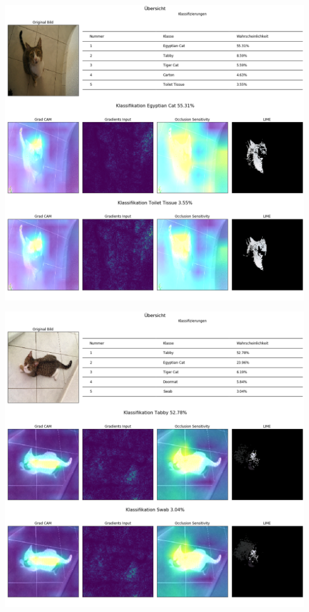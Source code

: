 \documentclass[
  12pt, %
  a4paper, %
  oneside, %
  openany, 
  numbers=noenddot, %
  BCOR=5mm, %
  parskip=half*, %
  thesis, %
]{bfhbook}
\begin{document}
\begin{center}
\begin{minipage}[t]{\linewidth}
\includegraphics[width=\textwidth]{Bilder/Mira-Classification.png}
\end{minipage}
\end{center}

\begin{center}
\begin{minipage}[t]{\linewidth}
\includegraphics[width=\textwidth]{Bilder/Mira-Classification-2.png}
\end{minipage}
\end{center}
\end{document}
